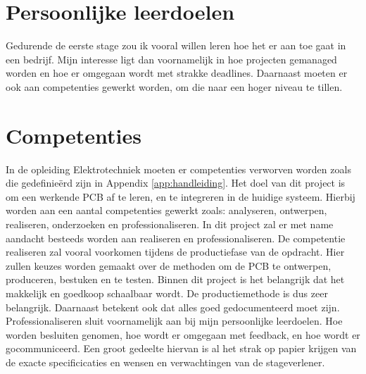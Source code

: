 
\section{Persoonlijke leerdoelen}
Gedurende de eerste stage zou ik vooral willen leren hoe het er aan toe gaat in een bedrijf. Mijn interesse ligt dan voornamelijk in hoe projecten gemanaged worden en hoe er omgegaan wordt met strakke deadlines. Daarnaast moeten er ook aan competenties gewerkt worden, om die naar een hoger niveau te tillen.

\section{Competenties}
In de opleiding Elektrotechniek moeten er competenties verworven worden zoals die gedefinieërd zijn in Appendix \ref{app:handleiding}. 
\newline
Het doel van dit project is om een werkende PCB af te leren, en te integreren in de huidige systeem. Hierbij worden aan een aantal competenties gewerkt zoals: analyseren, ontwerpen, realiseren, onderzoeken en professionaliseren. In dit project zal er met name aandacht besteeds worden aan realiseren en professionaliseren. 
\newline
De competentie realiseren zal vooral voorkomen tijdens de productiefase van de opdracht. Hier zullen keuzes worden gemaakt over de methoden om de PCB te ontwerpen, produceren, bestuken en te testen. Binnen dit project is het belangrijk dat het makkelijk en goedkoop schaalbaar wordt. De productiemethode is dus zeer belangrijk. Daarnaast betekent ook dat alles goed gedocumenteerd moet zijn. 
\newline
Professionaliseren sluit voornamelijk aan bij mijn persoonlijke leerdoelen. Hoe worden besluiten genomen, hoe wordt er omgegaan met feedback, en hoe wordt er gocommuniceerd. Een groot gedeelte hiervan is al het strak op papier krijgen van de exacte specificicaties en wensen en verwachtingen van de stageverlener. 